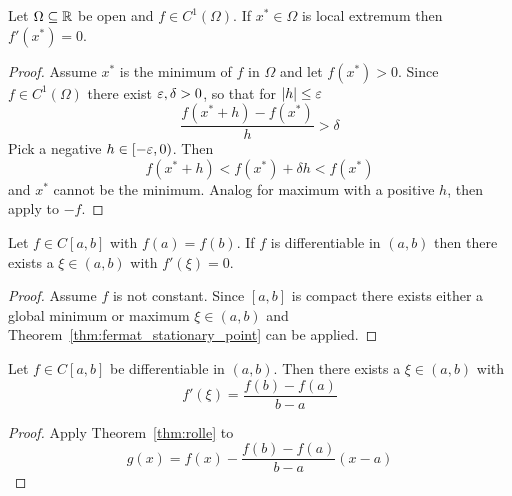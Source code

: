 \begin{theorem}\label{thm:fermat_stationary_point}
    Let \( \Omega \subseteq \mathbb{R} \) be open and \( f \in C^1(\Omega) \). If \( x^* \in \Omega \) is local extremum
    then \( f'(x^*) = 0 \).
\end{theorem}

\begin{proof}
    Assume \( x^* \) is the minimum of \( f \) in \( \Omega \) and let \( f(x^*) > 0 \).
    Since \( f \in C^1(\Omega) \) there exist \( \varepsilon, \delta > 0 \), so that for \( |h| \le \varepsilon \)
    \[
        \frac{f(x^* + h) - f(x^*)}{h} > \delta
    \]
    Pick a negative \( h \in [-\varepsilon, 0) \). Then   %
    \[
        f(x^* + h) < f(x^*) +  \delta h < f(x^*)
    \]
    and \( x^* \) cannot be the minimum. Analog for maximum with a positive \( h \), then apply to \( -f \).
\end{proof}
\bigskip


\begin{theorem}[Rolle]\label{thm:rolle}
    Let \( f \in C[a,b] \) with \( f(a) = f(b) \). If \( f \) is differentiable in \( (a, b) \) then
    there exists a \( \xi \in (a,b) \) with \( f'(\xi) = 0 \).
\end{theorem}

\begin{proof}
    Assume \( f \) is not constant. Since \( [a,b] \) is compact there exists either a global minimum or maximum
    \( \xi \in (a,b) \) and Theorem~\ref{thm:fermat_stationary_point} can be applied.
\end{proof}
\bigskip


\begin{theorem}\label{thm:mean_value}
    Let \( f \in C[a,b] \) be differentiable in \( (a, b) \). Then there exists a \( \xi \in (a,b) \) with
    \[
        f'(\xi) = \frac{f(b) - f(a)}{b - a}
    \]
\end{theorem}

\begin{proof}
    Apply Theorem~\ref{thm:rolle} to
    \[
        g(x) = f(x) - \frac{f(b) - f(a)}{b - a} (x -a)
    \]
\end{proof}
\bigskip


